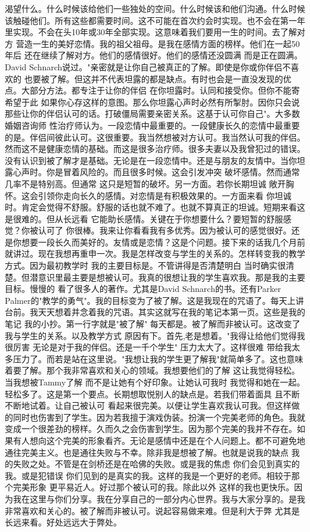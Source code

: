 渴望什么。什么时候该给他们一些独处的空间。什么时候该和他们沟通。什么时候该触碰他们。所有这些都需要时间。这不可能在首次约会时实现。也不会在第一年里实现。不会在头10年或30年全部实现。这意味着我们要用一生的时间。去了解对方 营造一生的美好恋情。我的祖父祖母。是我在感情方面的榜样。他们在一起50年后 还在继续了解对方。他们的感情很好。他们的感情还没圆满 而是正在圆满。David Schnarch说过。"亲密就是让你自己被真正的了解。即使是你或你伴侣不喜欢的 也要被了解。但这并不代表坦露的都是缺点。有时也会是一直没发现的优点。大部分方法。都专注于让你的伴侣 在你坦露时。认同和接受你。但你不能寄希望于此 如果你心存这样的意图。那么你坦露心声时必然有所掣肘。因你只会说那些让你的伴侣认可的话。打破僵局需要亲密关系。这基于认可你自己"。大多数婚姻咨询师 性治疗师认为。一段恋情中最重要的。一段健康长久的恋情中最重要的是。伴侣间彼此认可。这很重要。我当然想被对方认可。我当然认可我的伴侣。然而这不是健康恋情的基础。而这是很多治疗师。很多夫妻以及我曾犯过的错误。没有认识到被了解才是基础。无论是在一段恋情中。还是与朋友的友情中。当你坦露心声时。你是冒着风险的。而且很多时候。这会引发冲突 破坏感情。然而通常 几率不是特别高。但通常 这只是短暂的破坏。另一方面。若你长期坦诚 敞开胸怀。这会引领你走向长久的感情。对恋情是有积极效果的。一方面来看 你坦诚时。肯定会觉得不舒服。舒服的话也就不难了。也就不算真正的坦诚。短期来看这是很难的。但从长远看 它能助长感情。关键在于你想要什么？要短暂的舒服感觉？你被认可了 你很棒。我来让你看看我有多优秀。因为被认可的感觉很好。还是你想要一段长久而美好的。友情或是恋情？这是个问题。接下来的话我几个月前就讲过。现在我想再重申一次。我是怎样改变与学生的关系的。怎样转变我的教学方式。因为最初教学时 我的主要目标是。不管讲得是否清楚明白 当时确实很清楚。但潜意识里最主要是想被认可。我真的很想让我的学生喜欢我。那是我的主要目标。慢慢的 看了很多人的著作。尤其是David Schnarch的书。还有Parker Palmer的"教学的勇气"。我的目标变为了被了解。这是我现在的咒语了。每天上讲台前。我天天想着并念着我的咒语。其实这就写在我的笔记本第一页。这些是我的笔记 我的小抄。第一行字就是"被了解" 每天都是。被了解而非被认可。这改变了我与学生的关系。以及教学方式 原因有下。首先,老是想着。"我得让给他们觉得我很厉害 无论是对于我的伴侣。还是一千个学生" 压力太大了。这样很难 带给我太多压力了。而若是站在这里说。"我想让我的学生更了解我"就简单多了。这也意味着要了解。那个我非常喜欢和关心的领域。我想要他们的了解 这让我觉得轻松。当我想被Tammy了解 而不是让她有个好印象。让她认可我时 我觉得和她在一起。轻松多了。这是第一个要点。长期想取悦别人的缺点是。若我们带着面具 且不断不断地试着。让自己被认可 看起来很完美。以便让学生喜欢我认可我。但这样做的同时也伤害到了学生。因为若我擅于演戏伪装。扮演一个完美老师的角色。我就变成一个很差劲的榜样。久而久之会伤害到学生。因为那个完美的我并不存在。如果有人想向这个完美的形象看齐。无论是感情中还是在个人问题上。都不可避免地通往完美主义。也是通往失败与不幸。除非我是想被了解。也就是说我的缺点 我的失败之处。不管是在剑桥还是在哈佛的失败。或是我的焦虑 你们会见到真实的我。或是犯错误 你们见到的是真实的我。这样的我是一个更好的老师。相较于那个完美形象 更平易近人。好过那个被认可的我。除此以外 这样的我也更快乐。因为我在这里与你们分享。我在分享自己的一部分内心世界。我与大家分享的。是我非常喜欢和关心的。被了解而非被认可。说起容易做来难。但是利大于弊 尤其是长远来看。好处远远大于弊处。 

